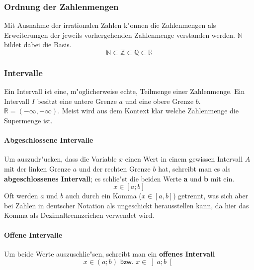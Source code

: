 \subsubsection{Ordnung der Zahlenmengen} 
Mit Ausnahme der irrationalen Zahlen k"onnen die Zahlenmengen als Erweiterungen der jeweils vorhergehenden Zahlenmenge verstanden werden. $\mathbb{N}$ bildet dabei die Basis.
\begin{equation*}
 \mathbb{N} \subset \mathbb{Z} \subset \mathbb{Q} \subset \mathbb{R}
\end{equation*}

\subsubsection{Intervalle}
Ein Intervall ist eine, m"oglicherweise echte, Teilmenge einer Zahlenmenge. Ein Intervall $I$ besitzt eine untere Grenze $a$ und eine obere Grenze $b$.
$\mathbb{R} = \left(-\infty, +\infty\right)$. Meist wird aus dem Kontext klar welche Zahlenmenge die Supermenge ist.

\paragraph{Abgeschlossene Intervalle}
\begin{flushleft}
Um auszudr"ucken, dass die Variable $x$ einen Wert in einem gewissen Intervall $A$ mit der linken Grenze $a$ und der rechten Grenze $b$ hat, schreibt man es als \textbf{abgeschlossenes Intervall}; es schlie"st die beiden Werte \textbf{a} und \textbf{b} mit ein. 
\begin{equation*}
x \in \left[a;b \right]
\end{equation*}
Oft werden $a$ und $b$ auch durch ein Komma ($x \in \left[a,b \right]$) getrennt, was sich aber bei Zahlen in deutscher Notation als ungeschickt herausstellen kann, da hier das Komma als Dezimaltrennzeichen verwendet wird.
\end{flushleft}

\paragraph{Offene Intervalle}
\begin{flushleft}
Um beide Werte auszuschlie"sen, schreibt man ein \textbf{offenes Intervall}
\begin{equation*}
x \in (a;b) \textsf{ bzw. } x \in \left]a;b \right[
\end{equation*}
\end{flushleft}

